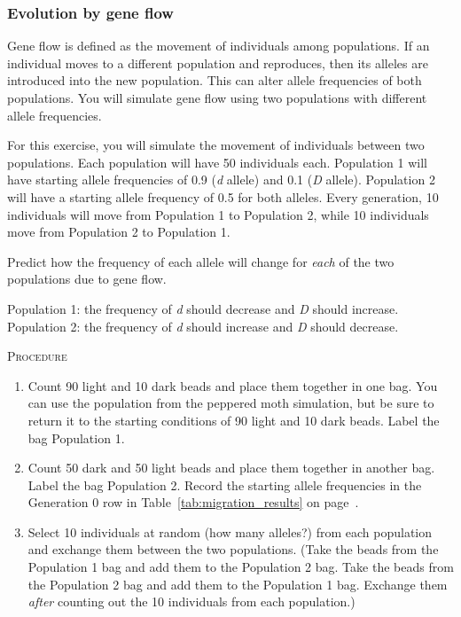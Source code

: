 \documentclass[12pt]{exam}
\newcommand*\AnswerBox[2]{%
    \parbox[t][#1]{0.92\textwidth}{%
    \begin{solution}#2\end{solution}}
    \vspace*{\stretch{1}}
}
\newcommand{\allele}[1]{\textit{#1}}
\begin{document}
\begin{questions}
\subsubsection*{Evolution by gene flow}

Gene flow is defined as the movement of individuals among populations.  If an individual moves to a different population and reproduces, then its alleles are introduced into the new population.  This can alter allele frequencies of both populations. You will simulate gene flow using two populations with different allele frequencies.

For this exercise, you will simulate the movement of individuals between two populations. Each population will have 50 individuals each. Population 1 will have starting allele frequencies of 0.9 (\allele{d} allele) and 0.1 (\allele{D} allele). Population 2 will have a starting allele frequency of 0.5 for both alleles. Every generation, 10 individuals will move from Population 1 to Population 2, while 10 individuals move from Population 2 to Population 1.

\question\label{ques:migration_prediction}
Predict how the frequency of each allele will change for \emph{each} of the two populations due to gene flow. 

\AnswerBox{3\baselineskip}{Population 1: the frequency of \allele{d} should decrease and \allele{D} should increase. Population 2: the frequency of \allele{d} should increase and \allele{D} should decrease.}

\textsc{Procedure}

\medskip

\begin{enumerate}

	\item Count 90 light and 10 dark beads and place them together in one bag. You can use the population from the peppered moth simulation, but be sure to return it to the starting conditions of 90 light and 10 dark beads. Label the bag Population 1.
	
	\item Count 50 dark and 50 light beads and place them together in another bag. Label the bag Population 2.  Record the starting allele frequencies in the Generation 0 row in Table~\ref{tab:migration_results} on page~\pageref{tab:migration_results}.
	
	\item Select 10 individuals at random (how many alleles?) from each population and exchange them between the two populations. (Take the beads from the Population 1 bag and add them to the Population 2 bag. Take the beads from the Population 2 bag and add them to the Population 1 bag. Exchange them \emph{after} counting out the 10 individuals from each population.)
	

\end{enumerate}
\end{questions}
\end{document}
